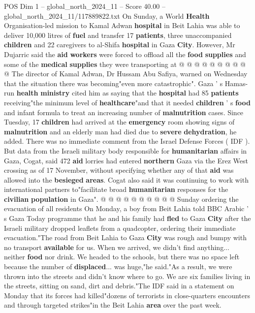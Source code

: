 \begin{textsample}{POS Dim 1 – global\_north\_2024\_11 – Score 40.00 – global\_north\_2024\_11/117889822.txt}
On Sunday, a World \textbf{Health} Organisation-led mission to Kamal Adwan \textbf{hospital} in Beit Lahia was able to deliver 10,000 litres of \textbf{fuel} and transfer 17 \textbf{patients}, three unaccompanied \textbf{children} and 22 caregivers to al-Shifa \textbf{hospital} in Gaza \textbf{City}.
However, Mr Dujarric said the \textbf{aid} \textbf{workers} were forced to offload all the \textbf{food} \textbf{supplies} and some of the \textbf{medical} \textbf{supplies} they were transporting at @ @ @ @ @ @ @ @ @ @ The director of Kamal Adwan, Dr Hussam Abu Safiya, warned on Wednesday that the situation there was becoming"even more catastrophic".
Gaza ' s Hamas-run \textbf{health} \textbf{ministry} cited him as saying that the \textbf{hospital} had 85 \textbf{patients} receiving"the minimum level of \textbf{healthcare}"and that it needed \textbf{children} ' s \textbf{food} and infant formula to treat an increasing number of \textbf{malnutrition} cases.
Since Tuesday, 17 \textbf{children} had arrived at the \textbf{emergency} room showing signs of \textbf{malnutrition} and an elderly man had died due to \textbf{severe} \textbf{dehydration}, he added.
There was no immediate comment from the Israel Defense Forces ( IDF ).
But data from the Israeli military body responsible for \textbf{humanitarian} affairs in Gaza, Cogat, said 472 \textbf{aid} lorries had entered \textbf{northern} Gaza via the Erez West crossing as of 17 November, without specifying whether any of that \textbf{aid} was allowed into the \textbf{besieged} \textbf{areas}.
Cogat also said it was continuing to work with international partners to"facilitate broad \textbf{humanitarian} responses for the \textbf{civilian} \textbf{population} in Gaza". @ @ @ @ @ @ @ @ @ @ Sunday ordering the evacuation of all residents On Monday, a boy from Beit Lahia told BBC Arabic ' s Gaza Today programme that he and his family had \textbf{fled} to Gaza \textbf{City} after the Israeli military dropped leaflets from a quadcopter, ordering their immediate evacuation."The road from Beit Lahia to Gaza \textbf{City} was rough and bumpy with no transport \textbf{available} for us.
When we arrived, we didn't find anything... neither \textbf{food} nor drink.
We headed to the schools, but there was no space left because the number of \textbf{displaced}... was huge,"he said."As a result, we were thrown into the streets and didn't know where to go.
We are six families living in the streets, sitting on sand, dirt and debris."The IDF said in a statement on Monday that its forces had killed"dozens of terrorists in close-quarters encounters and through targeted strikes"in the Beit Lahia \textbf{area} over the past week.

\end{textsample}
